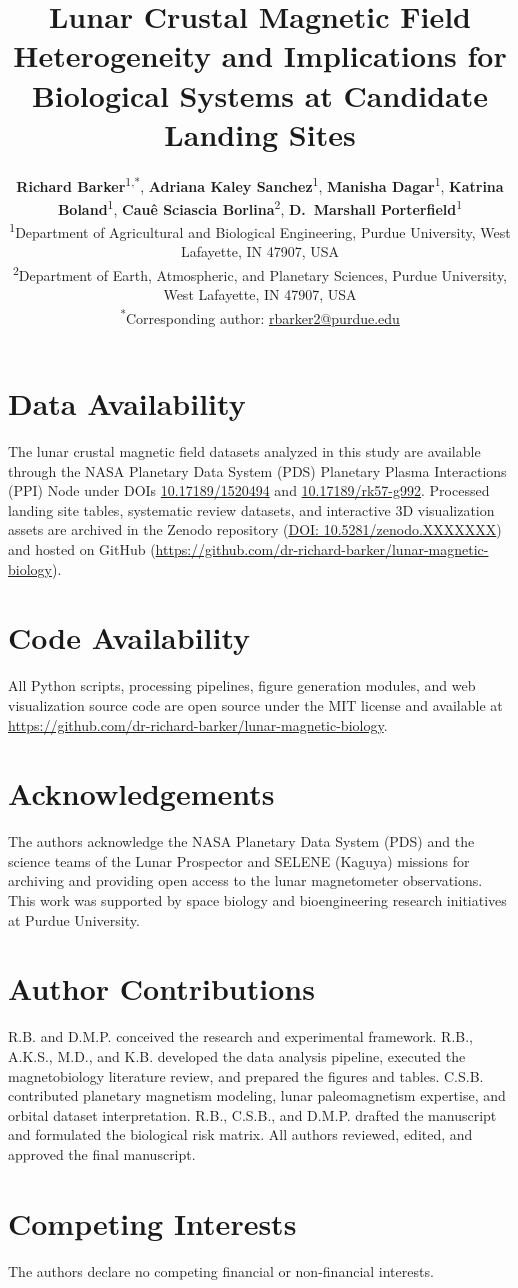 \documentclass{npj-article}
\title{Lunar Crustal Magnetic Field Heterogeneity and Implications for Biological Systems at Candidate Landing Sites}
\author{%
  \textbf{Richard Barker}\textsuperscript{1,*},
  \textbf{Adriana Kaley Sanchez}\textsuperscript{1},
  \textbf{Manisha Dagar}\textsuperscript{1},
  \textbf{Katrina Boland}\textsuperscript{1},
  \textbf{Cau\^{e} Sciascia Borlina}\textsuperscript{2},
  \textbf{D.~Marshall Porterfield}\textsuperscript{1}
  \vspace{2mm}\\
  \textsuperscript{1}\footnotesize Department of Agricultural and Biological Engineering, Purdue University, West Lafayette, IN 47907, USA\\
  \textsuperscript{2}\footnotesize Department of Earth, Atmospheric, and Planetary Sciences, Purdue University, West Lafayette, IN 47907, USA\\
  \textsuperscript{*}\footnotesize Corresponding author: \href{mailto:rbarker2@purdue.edu}{rbarker2@purdue.edu}
}
\begin{document}
\makefrontmatter







\section*{Data Availability}
The lunar crustal magnetic field datasets analyzed in this study are available through the NASA Planetary Data System (PDS) Planetary Plasma Interactions (PPI) Node under DOIs \href{https://doi.org/10.17189/1520494}{10.17189/1520494} and \href{https://doi.org/10.17189/rk57-g992}{10.17189/rk57-g992}. Processed landing site tables, systematic review datasets, and interactive 3D visualization assets are archived in the Zenodo repository (\href{https://doi.org/10.5281/zenodo.XXXXXXX}{DOI: 10.5281/zenodo.XXXXXXX}) and hosted on GitHub (\url{https://github.com/dr-richard-barker/lunar-magnetic-biology}).

\section*{Code Availability}
All Python scripts, processing pipelines, figure generation modules, and web visualization source code are open source under the MIT license and available at \url{https://github.com/dr-richard-barker/lunar-magnetic-biology}.

\section*{Acknowledgements}
The authors acknowledge the NASA Planetary Data System (PDS) and the science teams of the Lunar Prospector and SELENE (Kaguya) missions for archiving and providing open access to the lunar magnetometer observations. This work was supported by space biology and bioengineering research initiatives at Purdue University.

\section*{Author Contributions}
R.B. and D.M.P. conceived the research and experimental framework. R.B., A.K.S., M.D., and K.B. developed the data analysis pipeline, executed the magnetobiology literature review, and prepared the figures and tables. C.S.B. contributed planetary magnetism modeling, lunar paleomagnetism expertise, and orbital dataset interpretation. R.B., C.S.B., and D.M.P. drafted the manuscript and formulated the biological risk matrix. All authors reviewed, edited, and approved the final manuscript.

\section*{Competing Interests}
The authors declare no competing financial or non-financial interests.

\renewcommand{\bibnumfmt}[1]{#1.}


\end{document}
